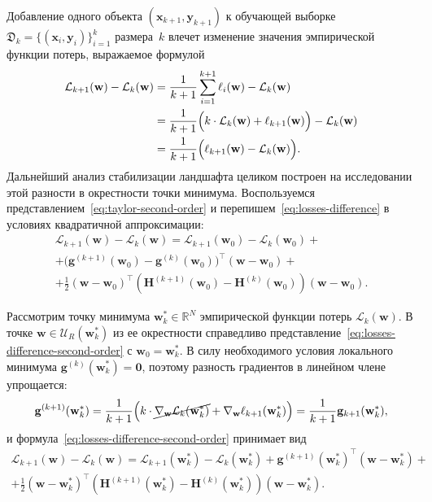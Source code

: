 Добавление одного объекта $(\mathbf{x}_{k+1}, \mathbf{y}_{k+1})$ к обучающей выборке $\mathfrak{D}_k = \{(\mathbf{x}_i, \mathbf{y}_i)\}_{i=1}^k$ размера~$k$ влечет изменение значения эмпирической функции потерь, выражаемое формулой
\begin{align}
    \label{eq:losses-difference}
    \mathcal{L}_{k+1}(\mathbf{w}) - \mathcal{L}_{k}(\mathbf{w})
    &=
    \frac{1}{k+1} \sum_{i=1}^{k+1} \ell_{i}(\mathbf{w})
    -
    \mathcal{L}_{k}(\mathbf{w})
    \notag \\
    &=
    \frac{1}{k+1} \Big( k \cdot \mathcal{L}_{k}(\mathbf{w}) + \ell_{k+1}(\mathbf{w}) \Big)
    -
    \mathcal{L}_{k}(\mathbf{w})
    \notag \\
    &=
    \frac{1}{k+1} \Big( \ell_{k+1}(\mathbf{w}) - \mathcal{L}_{k}(\mathbf{w}) \Big).
\end{align}
Дальнейший анализ стабилизации ландшафта целиком построен на исследовании этой разности в окрестности точки минимума. Воспользуемся представлением~\eqref{eq:taylor-second-order} и перепишем~\eqref{eq:losses-difference} в условиях квадратичной аппроксимации:
\begin{multline}
    \label{eq:losses-difference-second-order}
    \mathcal{L}_{k+1}(\mathbf{w}) - \mathcal{L}_{k}(\mathbf{w}) = \mathcal{L}_{k+1}(\mathbf{w}_0) - \mathcal{L}_{k}(\mathbf{w}_0) + \\ + \Big( \mathbf{g}^{(k+1)}(\mathbf{w}_0) - \mathbf{g}^{(k)}(\mathbf{w}_0) \Big)^\top (\mathbf{w} - \mathbf{w}_0) + \\ + \frac{1}{2} (\mathbf{w} - \mathbf{w}_0)^{\top} \left( \mathbf{H}^{(k+1)}(\mathbf{w}_0) - \mathbf{H}^{(k)}(\mathbf{w}_0) \right) (\mathbf{w} - \mathbf{w}_0).
\end{multline}

Рассмотрим точку минимума $\mathbf{w}_{k}^{*} \in \mathbb{R}^{N}$ эмпирической функции потерь $\mathcal{L}_{k}(\mathbf{w})$. В точке $\mathbf{w} \in \mathcal{U}_{R}(\mathbf{w}_{k}^{*})$ из ее окрестности справедливо представление~\eqref{eq:losses-difference-second-order} с $\mathbf w_0 = \mathbf w_k^*$. В силу необходимого условия локального минимума $\mathbf{g}^{(k)}(\mathbf{w}_{k}^{*}) = \mathbf{0}$, поэтому разность градиентов в линейном члене упрощается:
\begin{equation}
    \mathbf{g}^{(k+1)}(\mathbf{w}_{k}^{*}) = \frac{1}{k+1}\Big( k \cdot \cancel{\nabla_{\mathbf{w}}\mathcal{L}_k(\mathbf{w}_k^*)} + \nabla_{\mathbf{w}} \ell_{k+1}(\mathbf{w}_k^*) \Big) = \frac{1}{k+1} \mathbf{g}_{k+1}(\mathbf{w}_k^*),
\end{equation}
и формула~\eqref{eq:losses-difference-second-order} принимает вид
\begin{multline}
    \label{eq:losses-difference-second-order-minimum}
    \mathcal{L}_{k+1}(\mathbf{w}) - \mathcal{L}_{k}(\mathbf{w}) = \mathcal{L}_{k+1}(\mathbf{w}_{k}^{*}) - \mathcal{L}_{k}(\mathbf{w}_{k}^{*}) + \mathbf{g}^{(k+1)}(\mathbf{w}_{k}^{*})^\top (\mathbf{w} - \mathbf{w}_{k}^{*}) + \\ + \frac{1}{2} (\mathbf{w} - \mathbf{w}_{k}^{*})^{\top} \left( \mathbf{H}^{(k+1)}(\mathbf{w}_{k}^{*}) - \mathbf{H}^{(k)}(\mathbf{w}_{k}^{*}) \right) (\mathbf{w} - \mathbf{w}_{k}^{*}).
\end{multline}

